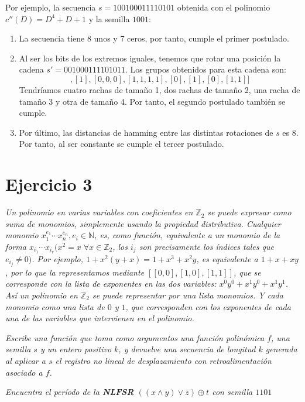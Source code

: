 \documentclass[10pt,spanish]{article}
\begin{document}
Por ejemplo, la secuencia $s=100100011110101$ obtenida con el polinomio $c''(D) = D^4 + D + 1$ y la semilla $1001$:
\begin{enumerate}[---]
    \item La secuencia tiene 8 unos y 7 ceros, por tanto, cumple el primer postulado.
    \item Al ser los bits de los extremos iguales, tenemos que rotar una posición la cadena $s' = 001000111101011$. Los grupos obtenidos para esta cadena son:
    \begin{displaymath}
        [[0,0],[1],[0,0,0],[1,1,1,1],[0],[1],[0],[1,1]]
    \end{displaymath}
    Tendríamos cuatro rachas de tamaño 1, dos rachas de tamaño 2, una racha de tamaño 3 y otra de tamaño 4. Por tanto, el segundo postulado también se cumple.
    \item Por último, las distancias de hamming entre las distintas rotaciones de $s$ es 8. Por tanto, al ser constante se cumple el tercer postulado.
\end{enumerate}

\section{\textcolor{azul}Ejercicio 3}
\textit{Un polinomio en varias variables con coeficientes en $\mathbb{Z}_2$ se puede expresar como suma de monomios,  simplemente  usando  la  propiedad  distributiva.   Cualquier  monomio $x_1^{e_1} \cdots x_n^{e_n} , e_i \in \mathbb{N}$, es, como función, equivalente a un monomio de la forma $x_{i_1} \cdots x_{i_r} (x^2=x \; \forall x \in \mathbb{Z}_2$, los $i_j$ son precisamente los índices tales que $e_{i_j} \neq 0)$.  Por ejemplo,  $1 + x^2 (y + x) = 1 + x^3 + x^2 y$, es equivalente a $1 + x + xy$, por lo que la representamos mediante $[[0, 0], [1, 0], [1, 1]]$, que se corresponde con la lista de exponentes en las dos variables: $x^0 y^0 + x^1 y^0 + x^1 y^1$.  Así un polinomio en $\mathbb{Z}_2$ se puede representar por una lista monomios.  Y cada monomio como una lista de $0$ y $1$, que corresponden con los exponentes de cada una de las variables que intervienen en el polinomio.}

\textit{Escribe una función que toma como argumentos una  función polinómica $f$, una semilla $s$ y un entero positivo $k$, y devuelve una secuencia de longitud $k$ generada al aplicar a $s$ el registro no lineal de desplazamiento con retroalimentación asociado a $f$.}

\textit{Encuentra el período de la \textbf{\textcolor{azul}{NLFSR}} $((x \wedge y) \vee \bar{z}) \oplus t$ con semilla $1101$}
\end{document}
